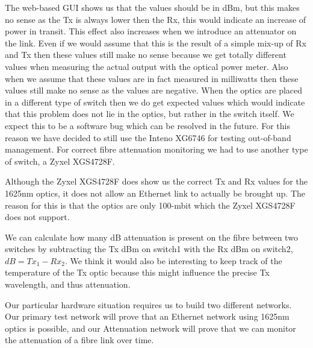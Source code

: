 \documentclass{article}
\begin{document}
The web-based GUI shows us that the values should be in dBm, but this makes no sense as the Tx is always lower then the Rx, this would indicate an increase of power in transit. This effect also increases when we introduce an attenuator on the link. Even if we would assume that this is the result of a simple mix-up of Rx and Tx then these values still make no sense because we get totally different values when measuring the actual output with the optical power meter. Also when we assume that these values are in fact measured in milliwatts then these values still make no sense as the values are negative. When the optics are placed in a different type of switch then we do get expected values which would indicate that this problem does not lie in the optics, but rather in the switch itself. We expect this to be a software bug which can be resolved in the future. For this reason we have decided to still use the Inteno XG6746 for testing out-of-band management. For correct fibre attenuation monitoring we had to use another type of switch, a Zyxel XGS4728F.

Although the Zyxel XGS4728F does show us the correct Tx and Rx values for the 1625nm optics, it does not allow an Ethernet link to actually be brought up. The reason for this is that the optics are only 100-mbit which the Zyxel XGS4728F does not support. 

We can calculate how many dB attenuation is present on the fibre between two switches by subtracting the Tx dBm on switch1 with the Rx dBm on switch2, $dB=Tx_1-Rx_2$. We think it would also be interesting to keep track of the temperature of the Tx optic because this might influence the precise Tx wavelength, and thus attenuation.

Our particular hardware situation requires us to build two different networks. Our primary test network will prove that an Ethernet network using 1625nm optics is possible, and our Attenuation network will prove that we can monitor the attenuation of a fibre link over time.
\newpage
\end{document}
